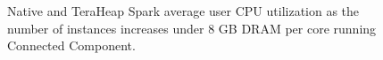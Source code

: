 \begin{figure}[thbp]
    \caption{Native and TeraHeap Spark average user CPU utilization
        as the number of instances increases under 8 GB DRAM per core running Connected Component.}
        \label{fig:cc_64_usr}

\end{figure}

